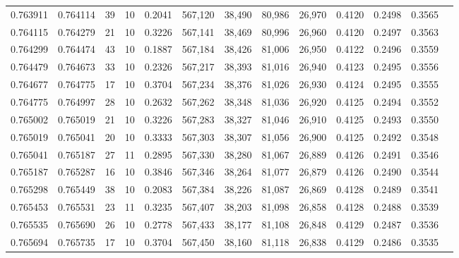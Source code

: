 \begin{tabular}{rrrrrrrrrrrrr}
0.763911 & 0.764114 &    39 &  10 &                                     0.2041 & 567,120 &  38,490 &  80,986 &  26,970 & 0.4120 & 0.2498 & 0.3565 \\
0.764115 & 0.764279 &    21 &  10 &                                     0.3226 & 567,141 &  38,469 &  80,996 &  26,960 & 0.4120 & 0.2497 & 0.3563 \\
0.764299 & 0.764474 &    43 &  10 &                                     0.1887 & 567,184 &  38,426 &  81,006 &  26,950 & 0.4122 & 0.2496 & 0.3559 \\
0.764479 & 0.764673 &    33 &  10 &                                     0.2326 & 567,217 &  38,393 &  81,016 &  26,940 & 0.4123 & 0.2495 & 0.3556 \\
0.764677 & 0.764775 &    17 &  10 &                                     0.3704 & 567,234 &  38,376 &  81,026 &  26,930 & 0.4124 & 0.2495 & 0.3555 \\
0.764775 & 0.764997 &    28 &  10 &                                     0.2632 & 567,262 &  38,348 &  81,036 &  26,920 & 0.4125 & 0.2494 & 0.3552 \\
0.765002 & 0.765019 &    21 &  10 &                                     0.3226 & 567,283 &  38,327 &  81,046 &  26,910 & 0.4125 & 0.2493 & 0.3550 \\
0.765019 & 0.765041 &    20 &  10 &                                     0.3333 & 567,303 &  38,307 &  81,056 &  26,900 & 0.4125 & 0.2492 & 0.3548 \\
0.765041 & 0.765187 &    27 &  11 &                                     0.2895 & 567,330 &  38,280 &  81,067 &  26,889 & 0.4126 & 0.2491 & 0.3546 \\
0.765187 & 0.765287 &    16 &  10 &                                     0.3846 & 567,346 &  38,264 &  81,077 &  26,879 & 0.4126 & 0.2490 & 0.3544 \\
0.765298 & 0.765449 &    38 &  10 &                                     0.2083 & 567,384 &  38,226 &  81,087 &  26,869 & 0.4128 & 0.2489 & 0.3541 \\
0.765453 & 0.765531 &    23 &  11 &                                     0.3235 & 567,407 &  38,203 &  81,098 &  26,858 & 0.4128 & 0.2488 & 0.3539 \\
0.765535 & 0.765690 &    26 &  10 &                                     0.2778 & 567,433 &  38,177 &  81,108 &  26,848 & 0.4129 & 0.2487 & 0.3536 \\
0.765694 & 0.765735 &    17 &  10 &                                     0.3704 & 567,450 &  38,160 &  81,118 &  26,838 & 0.4129 & 0.2486 & 0.3535 \\

\end{tabular}
